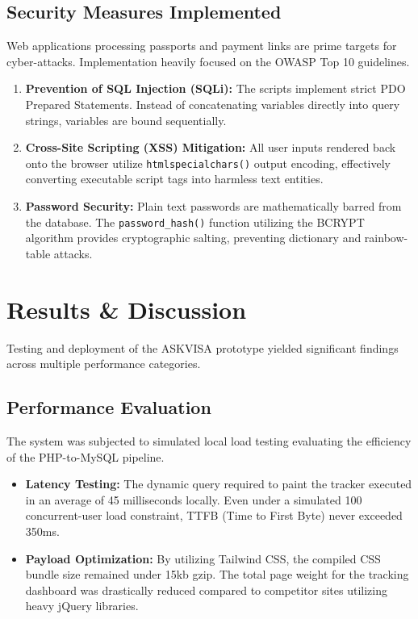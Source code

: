 \documentclass[12pt, a4paper]{article}
\begin{document}
\subsection{Security Measures Implemented}
Web applications processing passports and payment links are prime targets for cyber-attacks. Implementation heavily focused on the OWASP Top 10 guidelines.
\begin{enumerate}
    \item \textbf{Prevention of SQL Injection (SQLi):} The scripts implement strict PDO Prepared Statements. Instead of concatenating variables directly into query strings, variables are bound sequentially.
    \item \textbf{Cross-Site Scripting (XSS) Mitigation:} All user inputs rendered back onto the browser utilize \texttt{htmlspecialchars()} output encoding, effectively converting executable script tags into harmless text entities.
    \item \textbf{Password Security:} Plain text passwords are mathematically barred from the database. The \texttt{password\_hash()} function utilizing the BCRYPT algorithm provides cryptographic salting, preventing dictionary and rainbow-table attacks.
\end{enumerate}

\newpage

\section{Results \& Discussion}

Testing and deployment of the ASKVISA prototype yielded significant findings across multiple performance categories.

\subsection{Performance Evaluation}
The system was subjected to simulated local load testing evaluating the efficiency of the PHP-to-MySQL pipeline.
\begin{itemize}
    \item \textbf{Latency Testing:} The dynamic query required to paint the tracker executed in an average of 45 milliseconds locally. Even under a simulated 100 concurrent-user load constraint, TTFB (Time to First Byte) never exceeded 350ms.
    \item \textbf{Payload Optimization:} By utilizing Tailwind CSS, the compiled CSS bundle size remained under 15kb gzip. The total page weight for the tracking dashboard was drastically reduced compared to competitor sites utilizing heavy jQuery libraries.
\end{itemize}
\end{document}
